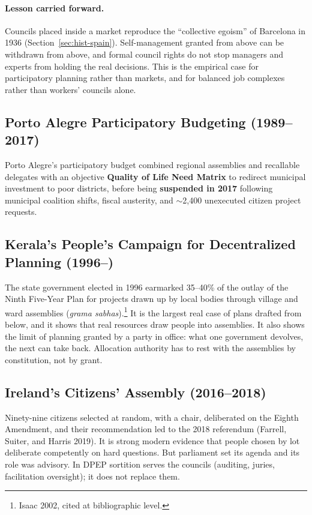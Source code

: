 \documentclass[10pt,twoside,openany]{book}
\theoremstyle{dpepstyle}
\begin{document}
\paragraph{Lesson carried forward.} Councils placed inside a market reproduce the ``collective egoism'' of Barcelona in 1936 (Section~\ref{sec:hist-spain}). Self-management granted from above can be withdrawn from above, and formal council rights do not stop managers and experts from holding the real decisions. This is the empirical case for participatory planning rather than markets, and for balanced job complexes rather than workers' councils alone.

\subsection{Porto Alegre Participatory Budgeting (1989--2017)}
Porto Alegre's participatory budget combined regional assemblies and recallable delegates with an objective \textbf{Quality of Life Need Matrix} to redirect municipal investment to poor districts, before being \textbf{suspended in 2017} following municipal coalition shifts, fiscal austerity, and $\sim$2,400 unexecuted citizen project requests.

\subsection{Kerala's People's Campaign for Decentralized Planning (1996--)}
The state government elected in 1996 earmarked 35--40\% of the outlay of the Ninth Five-Year Plan for projects drawn up by local bodies through village and ward assemblies (\emph{grama sabhas}).\footnote{Isaac 2002, cited at bibliographic level.} It is the largest real case of plans drafted from below, and it shows that real resources draw people into assemblies. It also shows the limit of planning granted by a party in office: what one government devolves, the next can take back. Allocation authority has to rest with the assemblies by constitution, not by grant.

\subsection{Ireland's Citizens' Assembly (2016--2018)}
Ninety-nine citizens selected at random, with a chair, deliberated on the Eighth Amendment, and their recommendation led to the 2018 referendum (Farrell, Suiter, and Harris 2019). It is strong modern evidence that people chosen by lot deliberate competently on hard questions. But parliament set its agenda and its role was advisory. In DPEP sortition serves the councils (auditing, juries, facilitation oversight); it does not replace them.
\end{document}
